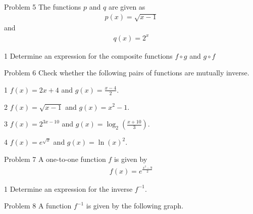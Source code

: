 %
%
%
%
%
\begin{opgavetekst}{Problem 5}
	The functions $p$ and $q$ are given as
	\begin{align*}
		p(x) = \sqrt{x - 1}
	\end{align*}
	and 
	\begin{align*}
		q(x) = 2^x
	\end{align*}
\end{opgavetekst}
\begin{delopgave}{1}
	Determine an expression for the composite functions $f\circ g$ and $g \circ f$
\end{delopgave}
%
%
%
%
%
\begin{opgavetekst}{Problem 6}
	Check whether the following pairs of functions are mutually inverse. 
\end{opgavetekst}
\begin{delopgave}{1}
	$f(x) = 2x + 4$ and $g(x) = \frac{x-4}{2}$.
\end{delopgave}
\begin{delopgave}{2}
	$f(x) = \sqrt{x-1}$ and $g(x) = x^2 - 1$.
\end{delopgave}
\begin{delopgave}{3}
	$f(x) = 2^{3x - 10}$ and $g(x) = \log_{2}\left(\frac{x+10}{3}\right)$.
\end{delopgave}
\begin{delopgave}{4}
	$f(x) = e^{\sqrt{x}}$ and $g(x) = \ln(x)^2$.
\end{delopgave}
%
%
%
%
%
\newpage
\begin{opgavetekst}{Problem 7}
	A one-to-one function $f$ is given by
	\begin{align*}	
		f(x) = e^{\frac{x^3-9}{2}}
	\end{align*}
\end{opgavetekst}
\begin{delopgave}{1}
	Determine an expression for the inverse $f^{-1}$.
\end{delopgave}
%
%
%
%
\begin{opgavetekst}{Problem 8}
A function $f^{-1}$ is given by the following graph.\\
\begin{center}
\end{center}
\phantom{h}
\end{opgavetekst}
